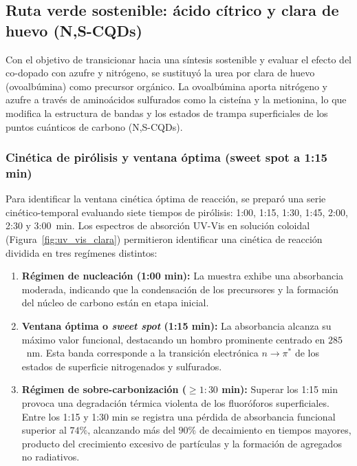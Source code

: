 \subsection{Ruta verde sostenible: ácido cítrico y clara de huevo (N,S-CQDs)}

Con el objetivo de transicionar hacia una síntesis sostenible y evaluar el efecto del co-dopado con azufre y nitrógeno, se sustituyó la urea por clara de huevo (ovoalbúmina) como precursor orgánico. La ovoalbúmina aporta nitrógeno y azufre a través de aminoácidos sulfurados como la cisteína y la metionina, lo que modifica la estructura de bandas y los estados de trampa superficiales de los puntos cuánticos de carbono (N,S-CQDs).

\subsubsection{Cinética de pirólisis y ventana óptima (sweet spot a 1:15 min)}

Para identificar la ventana cinética óptima de reacción, se preparó una serie cinético-temporal evaluando siete tiempos de pirólisis: 1:00, 1:15, 1:30, 1:45, 2:00, 2:30 y 3:00~min. Los espectros de absorción UV-Vis en solución coloidal (Figura~\ref{fig:uv_vis_clara}) permitieron identificar una cinética de reacción dividida en tres regímenes distintos:

\begin{enumerate}[label=\alph*)]
    \item \textbf{Régimen de nucleación (1:00 min):} La muestra exhibe una absorbancia moderada, indicando que la condensación de los precursores y la formación del núcleo de carbono están en etapa inicial.
    \item \textbf{Ventana óptima o \textit{sweet spot} (1:15 min):} La absorbancia alcanza su máximo valor funcional, destacando un hombro prominente centrado en $285$~nm. Esta banda corresponde a la transición electrónica $n \to \pi^*$ de los estados de superficie nitrogenados y sulfurados.
    \item \textbf{Régimen de sobre-carbonización ($\ge 1:30$ min):} Superar los 1:15 min provoca una degradación térmica violenta de los fluoróforos superficiales. Entre los 1:15 y 1:30 min se registra una pérdida de absorbancia funcional superior al $74\%$, alcanzando más del $90\%$ de decaimiento en tiempos mayores, producto del crecimiento excesivo de partículas y la formación de agregados no radiativos.
\end{enumerate}

